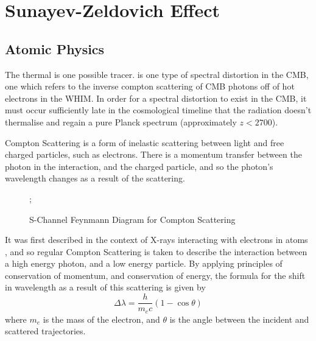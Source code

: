 \section{Sunayev-Zeldovich Effect}

\subsection{Atomic Physics}
The thermal \sze is one possible tracer. \sze is one type of spectral distortion in the CMB, one which refers to the inverse compton scattering of CMB photons off of hot electrons in the WHIM. In order for a spectral distortion to exist in the CMB, it must occur sufficiently late in the cosmological timeline that the radiation doesn't thermalise and regain a pure Planck spectrum (approximately $z < 2700$).

Compton Scattering is a form of inelastic scattering between light and free charged particles, such as electrons. There is a momentum transfer between the photon in the interaction, and the charged particle, and so the photon's wavelength changes as a result of the scattering. 

\begin{figure}[h!]
\centering
;
\label{fig:compton_scattering}
\caption{S-Channel Feynmann Diagram for Compton Scattering}
\end{figure}


It was first described in the context of X-rays interacting with electrons in atoms \citep{1923PhRv...21..483C}, and so regular Compton Scattering is taken to describe the interaction between a high energy photon, and a low energy particle. By applying principles of conservation of momentum, and conservation of energy,  the formula for the shift in wavelength as a result of this scattering is given by
\begin{equation}
	\Delta \lambda = \frac{h}{m_ec}\left(1-\cos\theta\right)
	\label{eqn:compton_shift}
\end{equation}
where $m_e$ is the mass of the electron, and $\theta$ is the angle between the incident and scattered trajectories. 

